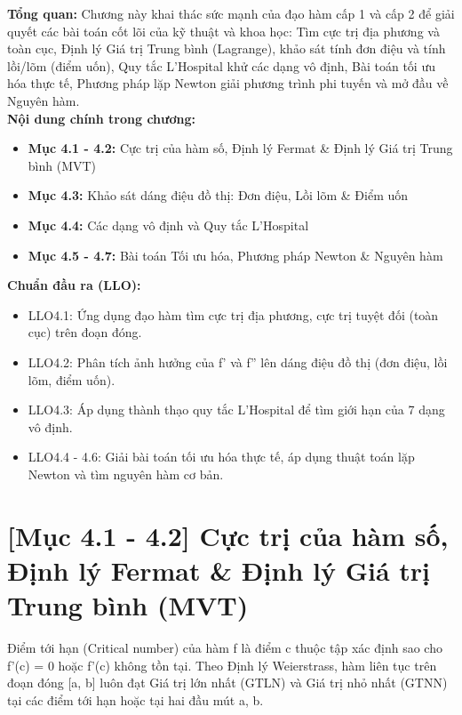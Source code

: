 \documentclass[11pt,a4paper,oneside]{book}
\begin{document}
\begin{tcolorbox}[colback=slate!5!white,colframe=slate!75!black,title={\textbf{Mục lục Chương 4 \& Chuẩn đầu ra (Buổi 4)}}]
\textbf{Tổng quan:} Chương này khai thác sức mạnh của đạo hàm cấp 1 và cấp 2 để giải quyết các bài toán cốt lõi của kỹ thuật và khoa học: Tìm cực trị địa phương và toàn cục, Định lý Giá trị Trung bình (Lagrange), khảo sát tính đơn điệu và tính lồi/lõm (điểm uốn), Quy tắc L'Hospital khử các dạng vô định, Bài toán tối ưu hóa thực tế, Phương pháp lặp Newton giải phương trình phi tuyến và mở đầu về Nguyên hàm.\\[6pt]
\textbf{Nội dung chính trong chương:}
\begin{itemize}[leftmargin=1.5em, itemsep=2pt]
  \item \textbf{Mục 4.1 - 4.2:} Cực trị của hàm số, Định lý Fermat \& Định lý Giá trị Trung bình (MVT)
  \item \textbf{Mục 4.3:} Khảo sát dáng điệu đồ thị: Đơn điệu, Lồi lõm \& Điểm uốn
  \item \textbf{Mục 4.4:} Các dạng vô định và Quy tắc L'Hospital
  \item \textbf{Mục 4.5 - 4.7:} Bài toán Tối ưu hóa, Phương pháp Newton \& Nguyên hàm
\end{itemize}
\textbf{Chuẩn đầu ra (LLO):}
\begin{itemize}[leftmargin=1.5em, itemsep=2pt]
  \item LLO4.1: Ứng dụng đạo hàm tìm cực trị địa phương, cực trị tuyệt đối (toàn cục) trên đoạn đóng.
  \item LLO4.2: Phân tích ảnh hưởng của f' và f'' lên dáng điệu đồ thị (đơn điệu, lồi lõm, điểm uốn).
  \item LLO4.3: Áp dụng thành thạo quy tắc L'Hospital để tìm giới hạn của 7 dạng vô định.
  \item LLO4.4 - 4.6: Giải bài toán tối ưu hóa thực tế, áp dụng thuật toán lặp Newton và tìm nguyên hàm cơ bản.
\end{itemize}
\end{tcolorbox}

\section{[Mục 4.1 - 4.2] Cực trị của hàm số, Định lý Fermat \& Định lý Giá trị Trung bình (MVT)}
Điểm tới hạn (Critical number) của hàm f là điểm c thuộc tập xác định sao cho f'(c) = 0 hoặc f'(c) không tồn tại. Theo Định lý Weierstrass, hàm liên tục trên đoạn đóng [a, b] luôn đạt Giá trị lớn nhất (GTLN) và Giá trị nhỏ nhất (GTNN) tại các điểm tới hạn hoặc tại hai đầu mút a, b.
\end{document}
